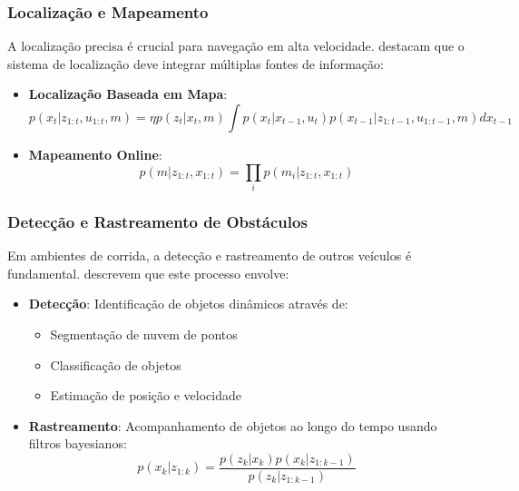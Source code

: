 \subsubsection{Localização e Mapeamento}

A localização precisa é crucial para navegação em alta velocidade.
\cite{Karaman2011Optimal} destacam que o sistema de localização deve integrar
múltiplas fontes de informação:

\begin{itemize}
    \item \textbf{Localização Baseada em Mapa}:
          \begin{equation}
              p(x_t | z_{1:t}, u_{1:t}, m) = \eta p(z_t | x_t, m) \int p(x_t | x_{t-1}, u_t) p(x_{t-1} | z_{1:t-1}, u_{1:t-1}, m) dx_{t-1}
          \end{equation}

    \item \textbf{Mapeamento Online}:
          \begin{equation}
              p(m | z_{1:t}, x_{1:t}) = \prod_i p(m_i | z_{1:t}, x_{1:t})
          \end{equation}
\end{itemize}

\subsubsection{Detecção e Rastreamento de Obstáculos}

Em ambientes de corrida, a detecção e rastreamento de outros veículos é
fundamental. \cite{Ivanov2020Verifying} descrevem que este processo envolve:

\begin{itemize}
    \item \textbf{Detecção}: Identificação de objetos dinâmicos através de:
          \begin{itemize}
              \item Segmentação de nuvem de pontos
              \item Classificação de objetos
              \item Estimação de posição e velocidade
          \end{itemize}

    \item \textbf{Rastreamento}: Acompanhamento de objetos ao longo do tempo usando filtros bayesianos:
          \begin{equation}
              p(x_k | z_{1:k}) = \frac{p(z_k | x_k) p(x_k | z_{1:k-1})}{p(z_k | z_{1:k-1})}
          \end{equation}
\end{itemize}


